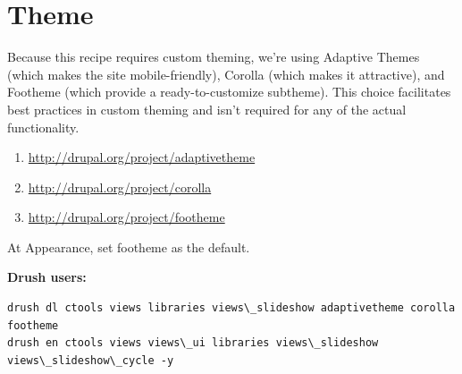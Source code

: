 \documentclass[letterpaper,10pt,english]{sphinxmanual}
\begin{document}
\section{Theme}
\label{slideshows:theme}
Because this recipe requires custom theming, we're using Adaptive Themes (which makes the site mobile-friendly), Corolla (which makes it attractive), and Footheme (which provide a ready-to-customize subtheme). This choice facilitates best practices in custom theming and isn't required for any of the actual functionality.
\begin{enumerate}
\item {} 
\href{http://drupal.org/project/adaptivetheme}{http://drupal.org/project/adaptivetheme}

\item {} 
\href{http://drupal.org/project/corolla}{http://drupal.org/project/corolla}

\item {} 
\href{http://drupal.org/project/footheme}{http://drupal.org/project/footheme}

\end{enumerate}

At Appearance, set footheme as the default.

\textbf{Drush users:}

\begin{Verbatim}[commandchars=\\\{\}]
drush dl ctools views libraries views\_slideshow adaptivetheme corolla footheme
drush en ctools views views\_ui libraries views\_slideshow views\_slideshow\_cycle -y
\end{Verbatim}
\end{document}
